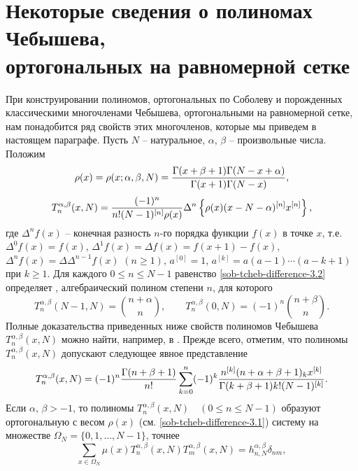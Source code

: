 \section{Некоторые сведения о полиномах Чебышева,\\ ортогональных на равномерной  сетке} \label{sob-tcheb-difference-s3}
При конструировании полиномов, ортогональных по Соболеву и порожденных классическими многочленами Чебышева, ортогональными на равномерной сетке, нам понадобится ряд свойств этих многочленов, которые мы приведем в настоящем параграфе.
 Пусть $N$ -- натуральное, $\alpha$, $\beta$ -- произвольные  числа. Положим
\begin{equation}
\rho(x)=\rho(x;\alpha,\beta,N)={\Gamma(x+\beta+1)
\Gamma(N-x+\alpha)\over \Gamma(x+1)\Gamma(N-x)}, \label{sob-tcheb-difference-3.1}
\end{equation}
\begin{equation}\label{sob-tcheb-difference-3.2}
T_n^{\alpha,\beta}(x,N)={(-1)^n\over n!(N-1)^{[n]}\rho(x)}\Delta^n
\left\{\rho(x)(x-N-\alpha)^{[n]}x^{[n]}\right\},
\end{equation}
 где $\Delta^nf(x)$ -- конечная разность $n$-го порядка функции
     $f(x)$ в точке $x$, т.е. $\Delta^0f(x)=f(x)$,
$\Delta^1f(x)=\Delta f(x)=f(x+1)-f(x)$, $\Delta^nf(x)=\Delta
\Delta^{n-1}f(x)$ $(n\ge1)$, $a^{[0]}=1$,
$a^{[k]}=a(a-1)\cdots(a-k+1)$ при $k\ge1$. Для каждого $0\le n\le
N-1$ равенство \eqref{sob-tcheb-difference-3.2} определяет \cite{sob-tcheb-difference-Cheb5}, алгебраический полином степени $n$,   для которого
$$
T_n^{\alpha,\beta}(N-1,N)={n+\alpha\choose n},\qquad
T_n^{\alpha,\beta}(0,N)=(-1)^n{n+\beta\choose n}.
$$
Полные доказательства приведенных ниже свойств полиномов Чебышева $T_n^{\alpha,\beta}(x,N)$
можно найти, например, в  \cite{meixner-22}. Прежде всего, отметим, что полиномы  $T_n^{\alpha,\beta}(x,N)$ допускают  следующее явное представление
\begin{equation}
T_n^{\alpha,\beta}(x,N)=(-1)^n{\Gamma(n+\beta+1)\over
n!}\sum_{k=0}^n(-1)^k {n^{[k]}(n+\alpha+\beta+1)_kx^{[k]}\over
\Gamma(k+\beta+1) k!(N-1)^{[k]}}. \label{sob-tcheb-difference-3.3}
\end{equation}
Если $\alpha$,
$\beta>-1$, то полиномы $T_n^{\alpha,\beta}(x,N)\quad (0\le n\le
N-1)$ образуют ортогональную  с весом $\rho(x)$ (см. \eqref{sob-tcheb-difference-3.1}) систему  на множестве
$\Omega_N=\{0,1,\ldots,N-1\}$, точнее
\begin{equation}
\sum_{x\in\Omega_N}\mu(x)T_n^{\alpha,\beta}(x,N)T_m^{\alpha,\beta}(x,N)
=h_{n,N}^{\alpha,\beta}\delta_{nm},\label{sob-tcheb-difference-3.4}
\end{equation}
